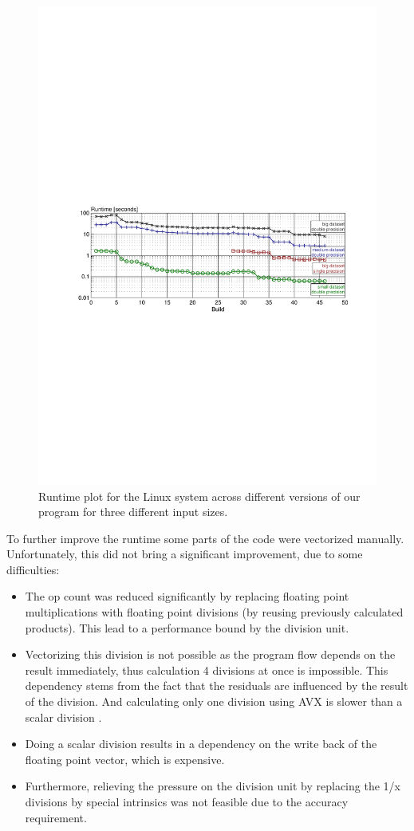 \begin{figure}\centering
  \includegraphics[scale = 0.8, trim={7cm 11cm 6cm 14cm}]{graphics/runtime_plot.pdf}
  \caption{Runtime plot for the Linux system across different versions of our program for three different input sizes.\label{runtime}}
\end{figure}

To further improve the runtime some parts of the code were vectorized manually. Unfortunately, this did not bring a significant improvement, due to some difficulties:
\begin{itemize}
	\item The op count was reduced significantly by replacing floating point multiplications with floating point divisions (by reusing previously calculated products). This lead to a performance bound by the division unit.
	\item Vectorizing this division is not possible as the program flow depends on the result immediately, thus calculation 4 divisions at once is impossible. This dependency stems from the fact that the residuals are influenced by the result of the division. And calculating only one division using AVX is slower than a scalar division \cite{intrinsics_guide}.
	\item Doing a scalar division results in a dependency on the write back of the floating point vector, which is expensive.
	\item Furthermore, relieving the pressure on the division unit by replacing the 1/x divisions by special intrinsics was not feasible due to the accuracy requirement.
\end{itemize}